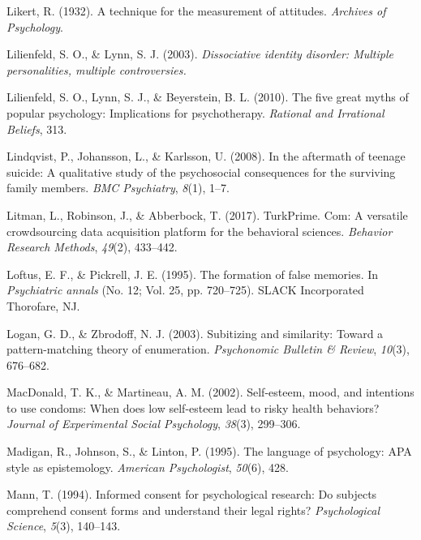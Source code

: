 \documentclass[
]{krantz}
\newlength{\cslhangindent}
\newenvironment{CSLReferences}[2] %
 {\begin{list}{}{%
  \setlength{\itemindent}{0pt}
  \setlength{\leftmargin}{0pt}
  \setlength{\parsep}{0pt}
  \ifodd #1
   \setlength{\leftmargin}{\cslhangindent}
   \setlength{\itemindent}{-1\cslhangindent}
  \fi
  \setlength{\itemsep}{#2\baselineskip}}}
 {\end{list}}
\begin{document}
\begin{CSLReferences}{1}{0}
Likert, R. (1932). A technique for the measurement of attitudes. \emph{Archives of Psychology}.

Lilienfeld, S. O., \& Lynn, S. J. (2003). \emph{Dissociative identity disorder: Multiple personalities, multiple controversies.}

Lilienfeld, S. O., Lynn, S. J., \& Beyerstein, B. L. (2010). The five great myths of popular psychology: Implications for psychotherapy. \emph{Rational and Irrational Beliefs}, 313.

Lindqvist, P., Johansson, L., \& Karlsson, U. (2008). In the aftermath of teenage suicide: A qualitative study of the psychosocial consequences for the surviving family members. \emph{BMC Psychiatry}, \emph{8}(1), 1--7.

Litman, L., Robinson, J., \& Abberbock, T. (2017). TurkPrime. Com: A versatile crowdsourcing data acquisition platform for the behavioral sciences. \emph{Behavior Research Methods}, \emph{49}(2), 433--442.

Loftus, E. F., \& Pickrell, J. E. (1995). The formation of false memories. In \emph{Psychiatric annals} (No. 12; Vol. 25, pp. 720--725). SLACK Incorporated Thorofare, NJ.

Logan, G. D., \& Zbrodoff, N. J. (2003). Subitizing and similarity: Toward a pattern-matching theory of enumeration. \emph{Psychonomic Bulletin \& Review}, \emph{10}(3), 676--682.

MacDonald, T. K., \& Martineau, A. M. (2002). Self-esteem, mood, and intentions to use condoms: When does low self-esteem lead to risky health behaviors? \emph{Journal of Experimental Social Psychology}, \emph{38}(3), 299--306.

Madigan, R., Johnson, S., \& Linton, P. (1995). The language of psychology: APA style as epistemology. \emph{American Psychologist}, \emph{50}(6), 428.

Mann, T. (1994). Informed consent for psychological research: Do subjects comprehend consent forms and understand their legal rights? \emph{Psychological Science}, \emph{5}(3), 140--143.


\end{CSLReferences}
\end{document}
